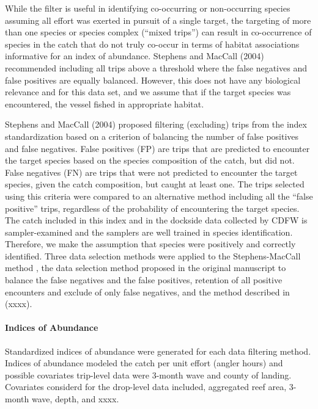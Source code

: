 \documentclass[]{elsarticle} %
\begin{document}
While the filter is useful in identifying co-occurring or non-occurring
species assuming all effort was exerted in pursuit of a single target,
the targeting of more than one species or species complex (``mixed
trips'') can result in co-occurrence of species in the catch that do not
truly co-occur in terms of habitat associations informative for an index
of abundance. Stephens and MacCall (2004) recommended including all
trips above a threshold where the false negatives and false positives
are equally balanced. However, this does not have any biological
relevance and for this data set, and we assume that if the target
species was encountered, the vessel fished in appropriate habitat.

Stephens and MacCall (2004) proposed filtering (excluding) trips from
the index standardization based on a criterion of balancing the number
of false positives and false negatives. False positives (FP) are trips
that are predicted to encounter the target species based on the species
composition of the catch, but did not. False negatives (FN) are trips
that were not predicted to encounter the target species, given the catch
composition, but caught at least one. The trips selected using this
criteria were compared to an alternative method including all the
``false positive'' trips, regardless of the probability of encountering
the target species. The catch included in this index and in the dockside
data collected by CDFW is sampler-examined and the samplers are well
trained in species identification. Therefore, we make the assumption
that species were positively and correctly identified. Three data
selection methods were applied to the Stephens-MacCall method , the data
selection method proposed in the original manuscript to balance the
false negatives and the false positives, retention of all positive
encounters and exclude of only false negatives, and the method described
in (xxxx).

\hypertarget{indices-of-abundance}{%
\paragraph{Indices of Abundance}\label{indices-of-abundance}}

Standardized indices of abundance were generated for each data filtering
method. Indices of abundance modeled the catch per unit effort (angler
hours) and possible covariates trip-level data were 3-month wave and
county of landing. Covariates considerd for the drop-level data
included, aggregated reef area, 3-month wave, depth, and xxxx.
\end{document}
